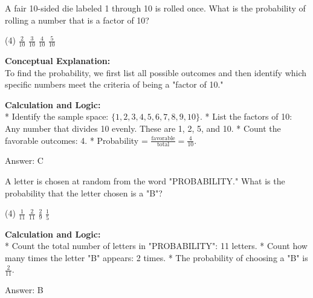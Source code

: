 \documentclass[11pt,paper=a4,answers]{exam}
\begin{document}
\begin{questions}
\vspace{60pt}

\question
A fair 10-sided die labeled 1 through 10 is rolled once. What is the probability of rolling a number that is a factor of 10?
\begin{tasks}(4)
    \task $\frac{2}{10}$
    \task $\frac{3}{10}$
    \task $\frac{4}{10}$
    \task $\frac{5}{10}$
\end{tasks}

\begin{solution}
\textbf{Conceptual Explanation:} \\
To find the probability, we first list all possible outcomes and then identify which specific numbers meet the criteria of being a "factor of 10."

\vspace{30pt}

\textbf{Calculation and Logic:} \\
* Identify the sample space: $\{1, 2, 3, 4, 5, 6, 7, 8, 9, 10\}$.
* List the factors of 10: Any number that divides 10 evenly. These are 1, 2, 5, and 10.
* Count the favorable outcomes: 4.
* Probability = $\frac{\text{favorable}}{\text{total}} = \frac{4}{10}$.

\vspace{30pt}

Answer: \colorbox{yellow!100}{C}
\end{solution}

\vspace{60pt}

\question
A letter is chosen at random from the word "PROBABILITY." What is the probability that the letter chosen is a "B"?
\begin{tasks}(4)
    \task $\frac{1}{11}$
    \task $\frac{2}{11}$
    \task $\frac{2}{9}$
    \task $\frac{1}{5}$
\end{tasks}

\begin{solution}
\textbf{Calculation and Logic:} \\
* Count the total number of letters in "PROBABILITY": 11 letters.
* Count how many times the letter "B" appears: 2 times.
* The probability of choosing a "B" is $\frac{2}{11}$.

\vspace{30pt}

Answer: \colorbox{yellow!100}{B}
\end{solution}


\end{questions}
\end{document}
